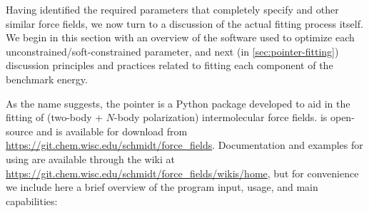 Having identified the required parameters that completely specify \mastiff
and other similar force fields, we now turn to a discussion of the actual
fitting process itself. We begin in this section with an overview of the
software used to optimize each unconstrained/soft-constrained parameter, and
next (in \cref{sec:pointer-fitting}) discussion principles and practices
related to fitting each component of the benchmark \sapt energy.

As the name suggests, the \acrfull{pointer} is a Python package developed to aid in the fitting of
(two-body + $N$-body polarization) intermolecular force fields. \pointer is
open-source and is available for download from
\url{https://git.chem.wisc.edu/schmidt/force_fields}.
Documentation and examples for using \pointer are available through the wiki at
\url{https://git.chem.wisc.edu/schmidt/force_fields/wikis/home}, but for
convenience we include here a brief overview of the program input, usage, and
main capabilities:


